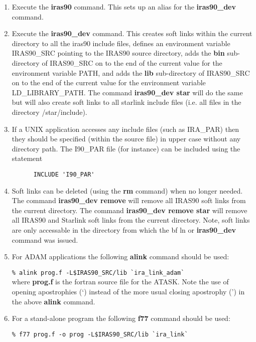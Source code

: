\begin{enumerate}
\item Execute the {\bf iras90} command. This sets up an alias for the 
{\bf iras90\_dev} command.

\item Execute the {\bf iras90\_dev} command.  This creates soft links
within the current directory to
all the iras90 include files, defines an environment variable IRAS90\_SRC
pointing to the IRAS90 source directory, adds the {\bf bin}
sub-directory of IRAS90\_SRC on to the end of the current value for the
environment variable PATH, and adds the {\bf lib} sub-directory of 
IRAS90\_SRC on to the end of the current value for the environment 
variable LD\_LIBRARY\_PATH. The command {\bf iras90\_dev star} will do
the same but will also create soft links to all starlink include files
(i.e. all files in the directory /star/include).

\item If a UNIX application accesses any include files (such as
IRA\_PAR) then they should be specified (within the source file) in upper case 
without any directory
path. The I90\_PAR file (for instance) can be included using the statement

\verb+      INCLUDE 'I90_PAR'+\\

\item Soft links can be deleted (using the {\bf rm} command) when no longer 
needed.
The command {\bf iras90\_dev remove} will remove all IRAS90 soft links from
the current directory. The command {\bf iras90\_dev remove star} will
remove all IRAS90 and Starlink soft links from the current directory.
Note, soft links are only accessable in the directory from which the {bf ln} 
or {\bf iras90\_dev} command was issued. 
\item For ADAM applications the following {\bf alink} command should be used:

\verb+% alink prog.f -L$IRAS90_SRC/lib `ira_link_adam`+\\

where {\bf prog.f} is the fortran source file for the ATASK.
Note the use of opening apostrophies (`) instead of the more usual closing
apostrophy (') in the above {\bf alink} command.

\item For a stand-alone program the following {\bf f77} command should be used:

\verb+% f77 prog.f -o prog -L$IRAS90_SRC/lib `ira_link`+\\
\end{enumerate}


